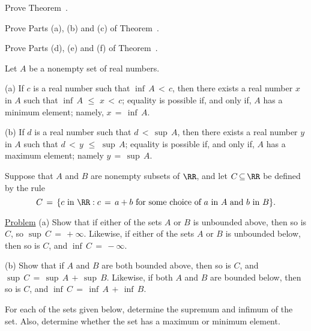 \V
\V

\noindent \ExBaf Prove Theorem~. %

\V
\V

\noindent \ExBag Prove Parts (a), (b) and (c) of Theorem~. %

\V
\V

\noindent \ExBah Prove Parts (d), (e) and (f) of Theorem~. %

\V
\V


\noindent \ExBai Let $A$ be a nonempty set of real numbers.

\V


        (a) If $c$ is a real number such that ${\inf}\,A\,<\,c$, then there exists a real number $x$ in $A$ such that ${\inf}\,A\,\,{\leq}\,\,x\,<\,c$;
    equality is possible if, and only if, $A$ has a minimum element; namely, $x \,=\, {\inf}\,A$.

\V

        (b) If $d$ is a real number such that $d\,<\,{\sup}\,A$, then there exists a real number $y$ in $A$ such that $d\,<\,y\,\,{\leq}\,\,{\sup}\,A$;
    equality is possible if, and only if, $A$ has a maximum element; namely $y \,=\, {\sup}\,A$.

\V
\V

\noindent \ExBaj Suppose that $A$ and $B$ are nonempty subsets of ${\RR}$, and let $C \,{\subseteq}\, {\RR}$ be defined by the rule
        \begin{displaymath}
        C \,=\, \{c \mbox{ in } {\RR}: c \,=\, a+b \mbox{ for some choice of $a$ in $A$ and $b$ in $B$}\}.
        \end{displaymath}

        \underline{Problem} (a) Show that if either of the sets $A$ or $B$ is unbounded above, then so is $C$, so ${\sup}\,C \,=\, +{\infty}$.
    Likewise, if either of the sets $A$ or $B$ is unbounded below, then so is $C$, and ${\inf}\,C \,=\, -{\infty}$.

\V

        (b) Show that if $A$ and $B$ are both bounded above, then so is $C$, and ${\sup}\,C \,=\, {\sup}\,A \,+\, {\sup}\,B$.
    Likewise, if both $A$ and $B$ are bounded below, then so is $C$, and ${\inf}\,C \,=\, {\inf}\,A \,+\, {\inf}\,B$.

\V
\V

\noindent \ExBak For each of the sets given below, determine the supremum and infimum of the set.
    Also, determine whether the set has a maximum or minimum element.

